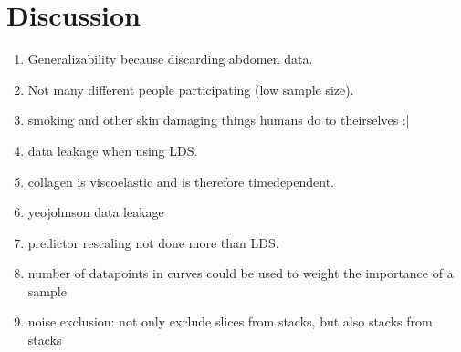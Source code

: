 \chapter{Discussion}

\begin{enumerate}
    \item Generalizability because discarding abdomen data.
    \item Not many different people participating (low sample size).
    \item smoking and other skin damaging things humans do to theirselves :|
    \item data leakage when using LDS.
    \item collagen is viscoelastic and is therefore timedependent.
    \item yeojohnson data leakage
    \item predictor rescaling not done more than LDS.
    \item number of datapoints in curves could be used to weight the importance of a sample
    \item noise exclusion: not only exclude slices from stacks, but also stacks from stacks
\end{enumerate}